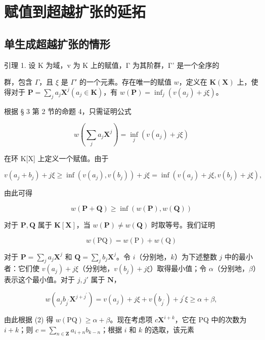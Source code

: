 \section{赋值到超越扩张的延拓}

\subsection{单生成超越扩张的情形}

引理 1. 设 K 为域，v 为 K 上的赋值，Γ 为其阶群，Γ' 是一个全序的

群，包含 \(\Gamma\)，且 \(\xi\) 是 \(\Gamma'\) 的一个元素。存在唯一的赋值 \(w\)，定义在 \(\mathbf{K}(\mathbf{X})\) 上，使得对于 \(\mathbf{P} = \sum_{j} a_j \mathbf{X}^j (a_j \in \mathbf{K})\)，有 \(w(\mathbf{P}) = \inf_j(v(a_j) + j\xi)\)。

根据 § 3 第 2 节的命题 4，只需证明公式

\[
w \left(\sum_ {j} a _ {j} \mathbf {X} ^ {j}\right) = \inf _ {j} (v (a _ {j}) + j \xi)\tag{1}
\]

在环 K{[}X{]} 上定义一个赋值。由于

\[
v \left(a _ {j} + b _ {j}\right) + j \xi \geqslant \inf (v \left(a _ {j}\right), v \left(b _ {j}\right)) + j \xi = \inf (v \left(a _ {j}\right) + j \xi , v \left(b _ {j}\right) + j \xi),
\]

由此可得

\[
w (\mathbf {P} + \mathbf {Q}) \geqslant \inf (w (\mathbf {P}), w (\mathbf {Q}))\tag{2}
\]

对于 \(\mathbf{P},\mathbf{Q}\) 属于 \(\mathbf{K}[\mathbf{X}]\)，当 \(w(\mathbf{P})\neq w(\mathbf{Q})\) 时取等号。我们证明

\[
w (\mathrm{PQ}) = w (\mathrm{P}) + w (\mathrm{Q})\tag{3}
\]

对于 \(\mathbf{P} = \sum_{j} a_{j} \mathbf{X}^{j}\) 和 \(\mathbf{Q} = \sum_{j} b_{j} \mathbf{X}^{j}\)。令 \(i\)（分别地，\(k\)）为下述整数 \(j\) 中的最小者：它们使 \(v(a_{j}) + j\xi\)（分别地，\(v(b_{j}) + j\xi\)）取得最小值；令 \(\alpha\)（分别地，\(\beta\)）表示这个最小值。对于 \(j, j'\) 属于 \(\mathbf{N}\)，

\[
w (a _ {j} b _ {j ^ {\prime}} \mathbf {X} ^ {j + j ^ {\prime}}) = v (a _ {j}) + j \xi + v (b _ {j ^ {\prime}}) + j ^ {\prime} \xi \geqslant \alpha + \beta ,
\]

由此根据 (2) 得 \(w(\mathrm{PQ}) \geqslant \alpha + \beta\)。现在考虑项 \(c\mathbf{X}^{i + k}\)，它在 PQ 中的次数为 \(i + k\)；则 \(c = \sum_{n \in \mathbf{Z}} a_{i + n} b_{k - n}\)；根据 \(i\) 和 \(k\) 的选取，该元素

